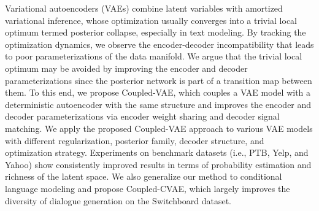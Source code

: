 Variational autoencoders (VAEs) combine latent variables with amortized variational inference, whose optimization usually converges into a trivial local optimum termed posterior collapse, especially in text modeling. By tracking the optimization dynamics, we observe the encoder-decoder incompatibility that leads to poor parameterizations of the data manifold. We argue that the trivial local optimum may be avoided by improving the encoder and decoder parameterizations since the posterior network is part of a transition map between them. To this end, we propose Coupled-VAE, which couples a VAE model with a deterministic autoencoder with the same structure and improves the encoder and decoder parameterizations via encoder weight sharing and decoder signal matching. We apply the proposed Coupled-VAE approach to various VAE models with different regularization, posterior family, decoder structure, and optimization strategy. Experiments on benchmark datasets (i.e., PTB, Yelp, and Yahoo) show consistently improved results in terms of probability estimation and richness of the latent space. We also generalize our method to conditional language modeling and propose Coupled-CVAE, which largely improves the diversity of dialogue generation on the Switchboard dataset.
